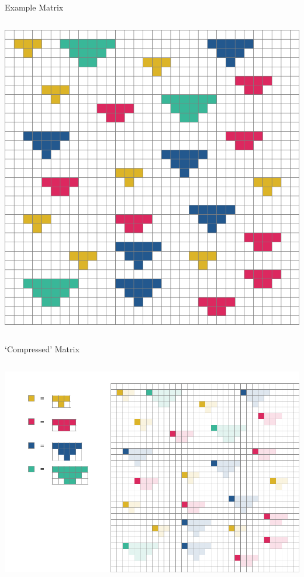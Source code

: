 \documentclass[11pt]{beamer}
\begin{document}

\begin{frame}{Example Matrix}
\nointerlineskip%
\begin{columns}
\column{\dimexpr\paperwidth}
\centering
\includegraphics[scale=.3]{"triangles_color"} 
\end{columns}
\end{frame}


\begin{frame}{`Compressed' Matrix}
\nointerlineskip%
\begin{columns}
\column{\dimexpr\paperwidth}
\centering
\includegraphics[scale=.3]{"triangles_compressed"} 
\end{columns}
\end{frame}
\end{document}
